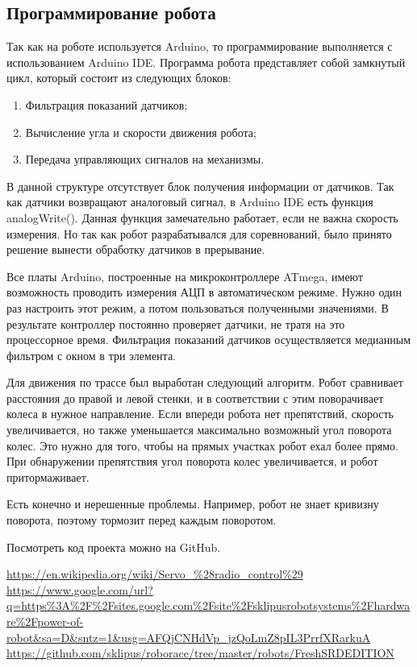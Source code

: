 \documentclass[10pt, a5paper]{article}
\begin{document}
\subsection*{Программирование робота}

Так как на роботе используется Arduino, то программирование выполняется с использованием Arduino IDE. Программа робота представляет собой замкнутый цикл, который состоит из следующих блоков:

\begin{enumerate}
  \item Фильтрация показаний датчиков;
  \item Вычисление угла и скорости движения робота;
  \item Передача управляющих сигналов на механизмы.
\end{enumerate}

В данной структуре отсутствует блок получения информации от датчиков. Так как датчики возвращают аналоговый сигнал, в Arduino IDE есть функция analogWrite(). Данная функция замечательно работает, если не важна скорость измерения. Но так как робот разрабатывался для соревнований, было принято решение вынести обработку датчиков в прерывание.

Все  платы Arduino, построенные на микроконтроллере ATmega, имеют возможность проводить измерения АЦП в автоматическом режиме. Нужно один раз настроить этот режим, а потом пользоваться полученными значениями. В результате контроллер постоянно проверяет датчики, не тратя на это процессорное время. Фильтрация показаний датчиков осуществляется медианным фильтром с окном в три элемента.

Для движения по трассе был выработан следующий алгоритм. Робот сравнивает расстояния до правой и левой стенки, и в соответствии с этим поворачивает колеса в нужное направление. Если впереди робота нет препятствий, скорость  увеличивается, но также уменьшается максимально возможный угол поворота колес. Это нужно для того, чтобы на прямых участках робот ехал более прямо. При обнаружении препятствия угол поворота колес увеличивается, и робот притормаживает.

Есть конечно и нерешенные проблемы. Например, робот не знает кривизну поворота, поэтому тормозит перед каждым поворотом.

Посмотреть код проекта можно на GitHub\footnotemark[3].

\begin{thebibliography}{99}

 \url{https://en.wikipedia.org/wiki/Servo\_\%28radio\_control\%29}
 \url{https://www.google.com/url?q=https\%3A\%2F\%2Fsites.google.com\%2Fsite\%2Fsklipusrobotsystems\%2Fhardware\%2Fpower-of-robot\&sa=D\&sntz=1\&usg=AFQjCNHdVp\_jzQoLmZ8pIL3PrrfXRarkuA}
 \url{https://github.com/sklipus/roborace/tree/master/robots/FreshSRDEDITION}
\end{thebibliography}
\end{document}
